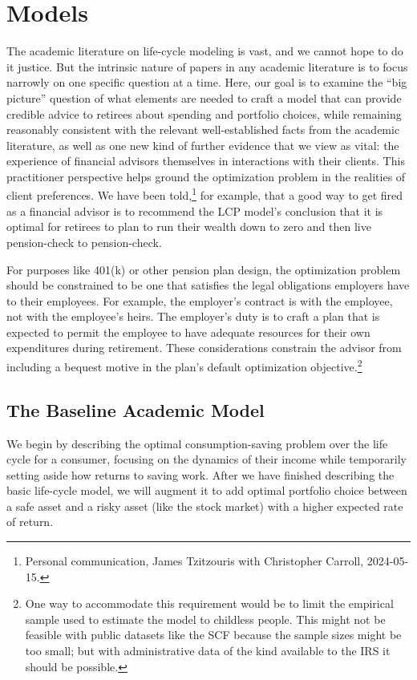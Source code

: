 \documentclass[12pt,letterpaper, fleqn]{article}
\begin{document}
\section{Models}\label{models}

The academic literature on life-cycle modeling is vast, and we cannot hope to do it justice.
But the intrinsic nature of papers in any academic literature is to focus narrowly on one specific question at a time.
Here, our goal is to examine the ``big picture'' question of what elements are needed to craft a model that can provide credible advice to retirees about spending and portfolio choices, while remaining reasonably consistent with the relevant well-established facts from the academic literature, as well as one new kind of further evidence that we view as vital: the experience of financial advisors themselves in interactions with their clients. This practitioner perspective helps ground the optimization problem in the realities of client preferences.
We have been told,\footnote{Personal communication, James Tzitzouris with Christopher Carroll, 2024-05-15.} for example, that a good way to get fired as a financial advisor is to recommend the LCP model's conclusion that it is optimal for retirees to plan to run their wealth down to zero and then live pension-check to pension-check.

For purposes like 401(k) or other pension plan design, the optimization problem should be constrained to be one that satisfies the legal obligations employers have to their employees.
For example, the employer's contract is with the employee, not with the employee's heirs.
The employer's duty is to craft a plan that is expected to permit the employee to have adequate resources for their own expenditures during retirement.
These considerations constrain the advisor from including a bequest motive in the plan's default optimization objective.\footnote{One way to accommodate this requirement would be to limit the empirical sample used to estimate the model to childless people.
This might not be feasible with public datasets like the SCF because the sample sizes might be too small; but with administrative data of the kind available to the IRS it should be possible.}

\subsection{The Baseline Academic Model}

We begin by describing the optimal consumption-saving problem over the life cycle for a consumer, focusing on the dynamics of their income while temporarily setting aside how returns to saving work.
After we have finished describing the basic life-cycle model, we will augment it to add optimal portfolio choice between a safe asset and a risky asset (like the stock market) with a higher expected rate of return.
\end{document}
